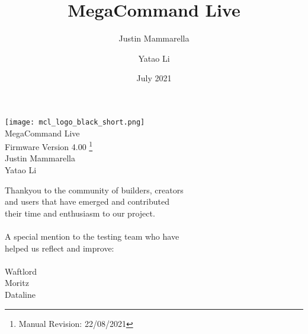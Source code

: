 \documentclass[openany,a4paper,12pt]{memoir}
\begin{document}
\author{
    Justin Mammarella
    \and
    Yatao Li
}
\title{MegaCommand Live}
\date{July 2021}

\frontmatter

	\begin{center}
	\vspace*{5.75cm}
	\texttt{[image: mcl\_logo\_black\_short.png]}
    \vspace*{1.00cm}
	\LARGE
	\vspace*{0.65cm}
	\\MegaCommand Live
    \large
	\\Firmware Version 4.00
	\footnote{Manual Revision: 22/08/2021}
    \vspace*{2cm}
    \\Justin Mammarella
    \\Yatao Li
\end{center}

\newpage
Thankyou to the community of builders, creators\\
and users that have emerged and contributed\\
their time and enthusiasm to our project.\\\\
A special mention to the testing team who have\\
helped us reflect and improve:\\\\
Waftlord\\
Moritz\\
Dataline\\
\mainmatter
\tableofcontents












%




















\backmatter

\end{document}
